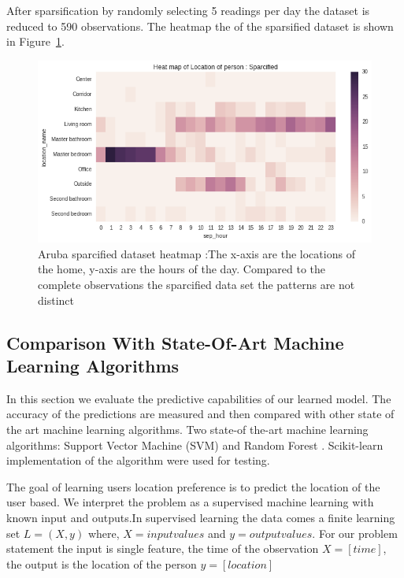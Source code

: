 After sparsification by randomly selecting 5 readings per day the dataset is reduced to 590 observations. The heatmap the of the sparsified dataset is shown in Figure~\ref{aruba-reduced-hist}. 

\begin{figure}[htp]
\centering
\includegraphics[width=\textwidth]{images/aruba-reduced-heatmap.png}
\caption[Aruba sparcified dataset heatmap]{Aruba sparcified dataset heatmap :The x-axis are the locations of the home, y-axis are the hours of the day. Compared to the complete observations the sparcified data set the patterns are not distinct}
\label{aruba-reduced-hist}
\end{figure}

\FloatBarrier


\subsection{Comparison With State-Of-Art Machine Learning Algorithms}

In this section we evaluate the predictive capabilities of our learned model. The accuracy of the predictions are measured and then compared with other state of the art machine learning algorithms. Two state-of the-art machine learning algorithms: Support Vector Machine (SVM)\cite{boser1992training, cortes1995support} and Random Forest \cite{breiman2001random, geurts2006extremely}. Scikit-learn \cite{sklearn_api} implementation of the algorithm were used for testing.

The goal of learning users location preference is to predict the location of the user based. We interpret the problem as a supervised machine learning with known input and outputs.In supervised learning the data comes a finite learning set $L =  (X, y)$ where, $X = input values$ and $y = output values$. 
For our problem statement the input is single feature, the time of the observation $X = [time]$, the output is the location of the person $y=[location]$

